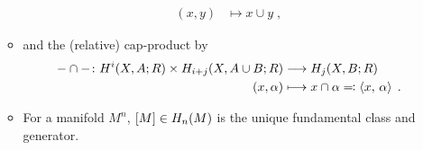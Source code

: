 \begin{itemize}
\begin{itemize}
\begin{align*}
      (x, y) &\longmapsto x\cup y\;,
    \end{align*}
  \item and the (relative) cap-product by
    \begin{align*}
      -\cap-\colon
      H^i(X,A;R)\times H_{i+j}(X,A\cup B;R) &\longrightarrow H_j(X,B;R)\\
      (x, \alpha) &\longmapsto x\cap \alpha \eqqcolon \left\langle x,\, \alpha \right\rangle
                    \;.
    \end{align*}
  \item For a manifold $M^n$, $[M]\in H_n(M)$ is the unique
    fundamental class and generator.
  \end{itemize}
\end{itemize}





